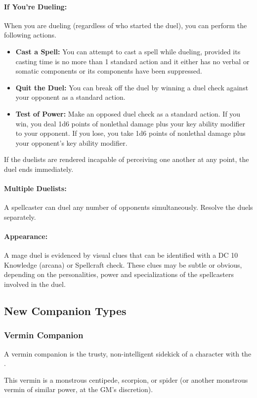 \paragraph{If You're Dueling:} When you are dueling (regardless of who started the duel), you can perform the following actions.
\begin{itemize}
 \item \textbf{Cast a Spell:} You can attempt to cast a spell while dueling, provided its casting time is no more than 1 standard action and it either has no verbal or somatic components or its components have been suppressed.
 \item \textbf{Quit the Duel:} You can break off the duel by winning a duel check against your opponent as a standard action.
 \item \textbf{Test of Power:} Make an opposed duel check as a standard action. If you win, you deal 1d6 points of nonlethal damage plus your key ability modifier to your opponent. If you lose, you take 1d6 points of nonlethal damage plus your opponent's key ability modifier.
\end{itemize}
If the duelists are rendered incapable of perceiving one another at any point, the duel ends immediately.
\paragraph{Multiple Duelists:} A spellcaster can duel any number of opponents simultaneously. Resolve the duels separately.
\paragraph{Appearance:} A mage duel is evidenced by visual clues that can be identified with a DC 10 Knowledge (arcana) or Spellcraft check. These clues may be subtle or obvious, depending on the personalities, power and specializations of the spellcasters involved in the duel.

\subsection{New Companion Types}
\subsubsection{Vermin Companion}
\label{sec:VerminCompanion}
A vermin companion is the trusty, non-intelligent sidekick of a character with the .

This vermin is a monstrous centipede, scorpion, or spider (or another monstrous vermin of similar power, at the GM's discretion).

